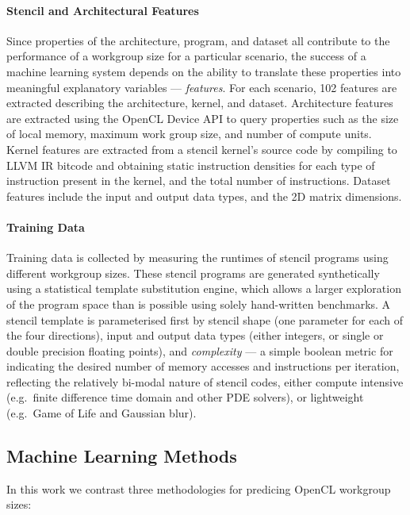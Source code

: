 \documentclass{acaces}
\begin{document}
\paragraph{Stencil and Architectural Features} Since properties of the
architecture, program, and dataset all contribute to the performance
of a workgroup size for a particular scenario, the success of a
machine learning system depends on the ability to translate these
properties into meaningful explanatory variables ---
\emph{features}. For each scenario, 102 features are extracted
describing the architecture, kernel, and dataset. Architecture
features are extracted using the OpenCL Device API to query properties
such as the size of local memory, maximum work group size, and number
of compute units. Kernel features are extracted from a stencil
kernel's source code by compiling to LLVM IR bitcode and obtaining
static instruction densities for each type of instruction present in
the kernel, and the total number of instructions. Dataset features
include the input and output data types, and the 2D matrix dimensions.


\paragraph{Training Data} Training data is collected by measuring the
runtimes of stencil programs using different workgroup sizes. These
stencil programs are generated synthetically using a statistical
template substitution engine, which allows a larger exploration of the
program space than is possible using solely hand-written benchmarks. A
stencil template is parameterised first by stencil shape (one
parameter for each of the four directions), input and output data
types (either integers, or single or double precision floating
points), and \emph{complexity} --- a simple boolean metric for
indicating the desired number of memory accesses and instructions per
iteration, reflecting the relatively bi-modal nature of stencil codes,
either compute intensive (e.g.\ finite difference time domain and
other PDE solvers), or lightweight (e.g.\ Game of Life and Gaussian
blur).


\subsection{Machine Learning Methods}\label{sec:ml}

In this work we contrast three methodologies for predicing OpenCL
workgroup sizes:
\end{document}
